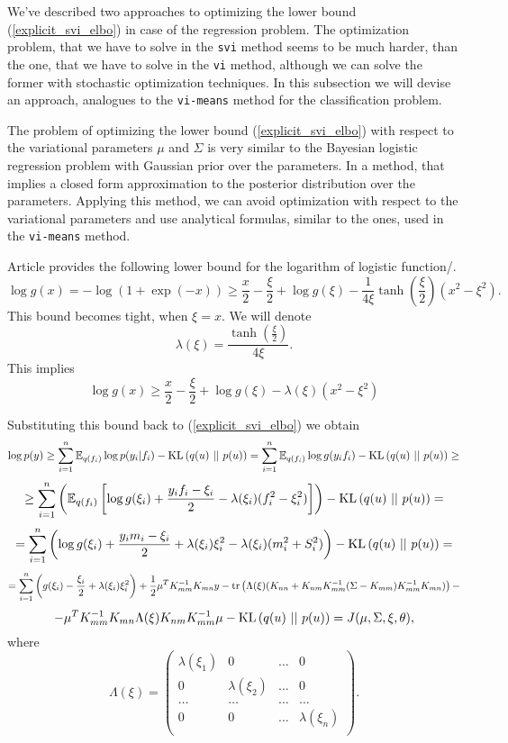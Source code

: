 We've described two approaches to optimizing the lower bound (\ref{explicit_svi_elbo}) in case of the regression problem. The optimization problem, that we have to solve in the \lstinline{svi} method seems to be much harder, than the one, that we have to solve in the \lstinline{vi} method, although we can solve the former with stochastic optimization techniques. In this subsection we will devise an approach, analogues to the \lstinline{vi-means} method for the classification problem.

The problem of optimizing the lower bound (\ref{explicit_svi_elbo}) with respect to the variational parameters $\mu$ and $\Sigma$ is very similar to the Bayesian logistic regression problem with Gaussian prior over the parameters. In \cite{JaakkolaJordan} a method, that implies a closed form approximation to the posterior distribution over the parameters. Applying this method, we can avoid optimization with respect to the variational parameters and use analytical formulas, similar to the ones, used in the \lstinline{vi-means} method.

Article \cite{JaakkolaJordan} provides the following lower bound for the logarithm of logistic function/.
$$\log g(x) = - \log(1 + \exp(-x)) \ge \frac x 2 - \frac \xi 2 + \log g(\xi) - \frac 1 {4 \xi} \tanh\left(\frac \xi 2 \right)(x^2 - \xi^2).$$
This bound becomes tight, when $\xi = x$.
We will denote $$\lambda(\xi) = \frac {\tanh\left(\frac\xi 2\right)}{4 \xi}.$$
This implies
$$\log g(x) \ge \frac x 2 - \frac \xi 2 + \log g(\xi) - \lambda(\xi) (x^2 - \xi^2)$$

Substituting this bound back to (\ref{explicit_svi_elbo}) we obtain
$$\log p(y) \ge \sum_{i = 1}^{n} \mathbb{E}_{q(f_i)} \log p(y_i | f_i) - \mbox{KL}\left(q(u)\mbox{ || }p(u)\right) = \sum_{i = 1}^{n} \mathbb{E}_{q(f_i)} \log g(y_i f_i) - \mbox{KL}\left(q(u)\mbox{ || }p(u)\right) \ge $$
$$\ge \sum_{i = 1}^{n}\left(\mathbb{E}_{q(f_i)} \left [\log g(\xi_i) + \frac {y_i f_i - \xi_i} {2} - \lambda(\xi_i) (f_i^2 - \xi_i^2) \right]\right) - \mbox{KL}\left(q(u)\mbox{ || }p(u)\right) = $$
$$= \sum_{i = 1}^{n} \left(\log g(\xi_i) + \frac {y_i m_i - \xi_i} {2}  + \lambda(\xi_i) \xi_i^2 - \lambda(\xi_i) (m_i^2 + S_i^2) \right) - \mbox{KL}\left(q(u)\mbox{ || }p(u)\right) = $$
$$= \sum_{i = 1}^{n} \left(g(\xi_i) - \frac {\xi_i}{2} + \lambda(\xi_i) \xi_i^2\right) + \frac 1 2 \mu^T K_{mm}^{-1} K_{mn} y - \mbox{tr}\left(\Lambda(\xi) (K_{nn} + K_{nm} K_{mm}^{-1} (\Sigma - K_{mm}) K_{mm}^{-1} K_{mn})\right) -$$
$$- \mu^T K_{mm}^{-1} K_{mn} \Lambda(\xi) K_{nm} K_{mm}^{-1} \mu - \mbox{KL}\left(q(u)\mbox{ || }p(u)\right) = J(\mu, \Sigma, \xi, \theta),$$
where 
$$\Lambda(\xi) = 
\left(
\begin{array}{cccc}
	\lambda(\xi_1) & 0 & \ldots & 0 \\
	0 & \lambda(\xi_2) & \ldots & 0 \\
	\ldots & \ldots & \ldots & \ldots \\
	0 & 0 & \ldots & \lambda(\xi_n) \\
\end{array}
\right).
$$

